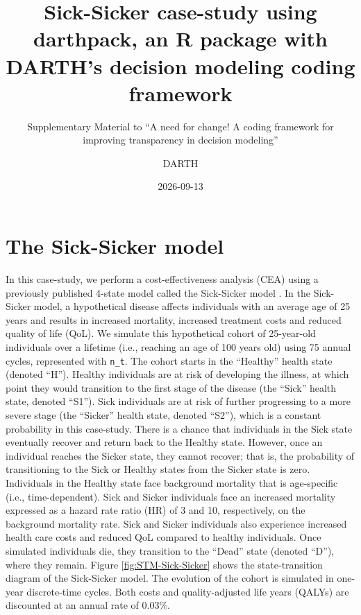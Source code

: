 \documentclass[
]{book}
\title{Sick-Sicker case-study using darthpack, an R package with DARTH's decision modeling coding framework}
\subtitle{Supplementary Material to ``A need for change! A coding framework for improving transparency in decision modeling''}
\author{DARTH}
\date{2026-09-13}
\begin{document}
\maketitle

{
\setcounter{tocdepth}{1}
\tableofcontents
}
\chapter*{The Sick-Sicker model}\label{the-sick-sicker-model}

In this case-study, we perform a cost-effectiveness analysis (CEA) using a previously published 4-state model called the Sick-Sicker model \citep{Enns2015}. In the Sick-Sicker model, a hypothetical disease affects individuals with an average age of 25 years and results in increased mortality, increased treatment costs and reduced quality of life (QoL). We simulate this hypothetical cohort of 25-year-old individuals over a lifetime (i.e., reaching an age of 100 years old) using 75 annual cycles, represented with \texttt{n\_t}. The cohort starts in the ``Healthy'' health state (denoted ``H''). Healthy individuals are at risk of developing the illness, at which point they would transition to the first stage of the disease (the ``Sick'' health state, denoted ``S1''). Sick individuals are at risk of further progressing to a more severe stage (the ``Sicker'' health state, denoted ``S2''), which is a constant probability in this case-study. There is a chance that individuals in the Sick state eventually recover and return back to the Healthy state. However, once an individual reaches the Sicker state, they cannot recover; that is, the probability of transitioning to the Sick or Healthy states from the Sicker state is zero. Individuals in the Healthy state face background mortality that is age-specific (i.e., time-dependent). Sick and Sicker individuals face an increased mortality expressed as a hazard rate ratio (HR) of 3 and 10, respectively, on the background mortality rate. Sick and Sicker individuals also experience increased health care costs and reduced QoL compared to healthy individuals. Once simulated individuals die, they transition to the ``Dead'' state (denoted ``D''), where they remain. Figure \ref{fig:STM-Sick-Sicker} shows the state-transition diagram of the Sick-Sicker model. The evolution of the cohort is simulated in one-year discrete-time cycles. Both costs and quality-adjusted life years (QALYs) are discounted at an annual rate of 0.03\%.
\end{document}
